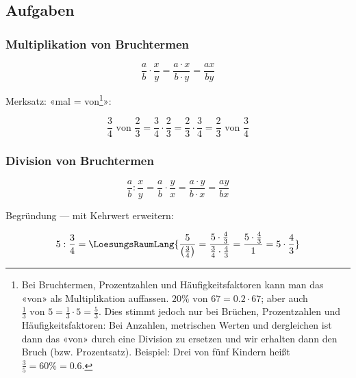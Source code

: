 \subsection*{Aufgaben}

%

\newpage




\subsubsection{Multiplikation von Bruchtermen}

\begin{gesetz}{}{}
$$\frac{a}{b}\cdot\frac{x}{y} = \frac{a\cdot x}{b\cdot y} = \frac{ax}{by}$$
\end{gesetz}

Merksatz:
«mal = von\footnote{Bei Bruchtermen, Prozentzahlen und
Häufigkeitsfaktoren kann man das «von» als Multiplikation
auffassen. $20\% \text{ von } 67 = 0.2 \cdot{} 67$; aber auch
$\frac{1}{3} \text{ von } 5
= \frac{1}{3}\cdot{5} = \frac{5}{3}$. Dies stimmt jedoch nur bei
Brüchen, Prozentzahlen und Häufigkeitsfaktoren: Bei Anzahlen,
metrischen Werten und dergleichen ist dann das «von» durch eine
Division zu ersetzen und wir erhalten dann den Bruch
(bzw. Prozentsatz). Beispiel: Drei von fünf Kindern heißt $\frac{3}{5}
= 60\% = 0.6$.}»:

$$\frac34 \text{ von } \frac23 = \frac34\cdot\frac23
=  \frac23\cdot\frac34 = \frac23 \text{ von } \frac34$$


\subsubsection{Division von Bruchtermen}
\begin{gesetz}{}{}
$$\frac{a}{b} : \frac{x}{y}=\frac{a}{b}\cdot\frac{y}{x} = \frac{a\cdot y}{b\cdot x} = \frac{ay}{bx}$$
\end{gesetz}

Begründung — mit Kehrwert erweitern:

$$5 : \frac{3}{4} = \LoesungsRaumLang{
\frac{5}{\left(\frac{3}{4}\right)} =
\frac{5\cdot{}\frac43}{\frac34\cdot{}\frac43} =
\frac{5\cdot{}\frac43}{1} = 5 \cdot{} \frac43}$$
\newpage

